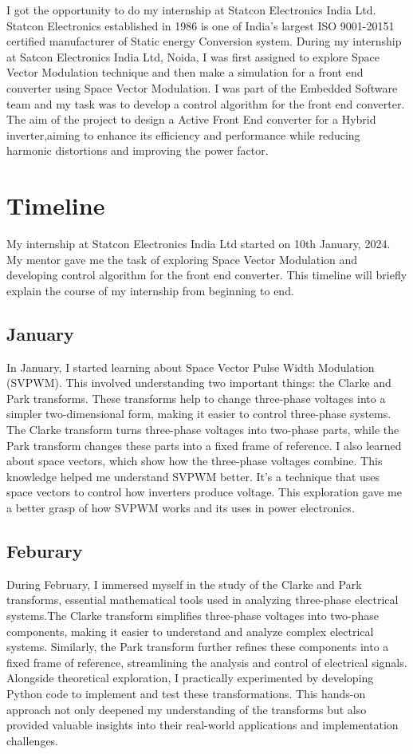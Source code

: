 I got the opportunity to do my internship at Statcon Electronics India Ltd.
Statcon Electronics established in 1986 is one of India's largest ISO
9001-20151 certified manufacturer of Static energy Conversion system. During my
internship at Satcon Electronics India Ltd, Noida, I was first assigned to
explore Space Vector Modulation technique and then make a simulation for a
front end converter using Space Vector Modulation. I was part of the Embedded
Software team and my task was to develop a control algorithm for the front end
converter.\\

The aim of the project to design a Active Front End converter for a Hybrid
inverter,aiming to enhance its efficiency and performance while reducing
harmonic distortions and improving the power factor.

\section{Timeline}
My internship at Statcon Electronics India Ltd started on 10th January, 2024.
My mentor gave me the task of exploring Space Vector Modulation and developing
control algorithm for the front end converter. This timeline will briefly
explain the course of my internship from beginning to end.

\subsection{January}
In January, I started learning about Space Vector Pulse Width Modulation
(SVPWM). This involved understanding two important things: the Clarke and Park
transforms. These transforms help to change three-phase voltages into a simpler
two-dimensional form, making it easier to control three-phase systems. The
Clarke transform turns three-phase voltages into two-phase parts, while the
Park transform changes these parts into a fixed frame of reference. I also
learned about space vectors, which show how the three-phase voltages combine.
This knowledge helped me understand SVPWM better. It's a technique that uses
space vectors to control how inverters produce voltage. This exploration gave
me a better grasp of how SVPWM works and its uses in power electronics.

\subsection{Feburary}
During February, I immersed myself in the study of the Clarke and Park
transforms, essential mathematical tools used in analyzing three-phase
electrical systems.The Clarke transform simplifies three-phase voltages into
two-phase components, making it easier to understand and analyze complex
electrical systems. Similarly, the Park transform further refines these
components into a fixed frame of reference, streamlining the analysis and
control of electrical signals. Alongside theoretical exploration, I practically
experimented by developing Python code to implement and test these
transformations. This hands-on approach not only deepened my understanding of
the transforms but also provided valuable insights into their real-world
applications and implementation challenges.

